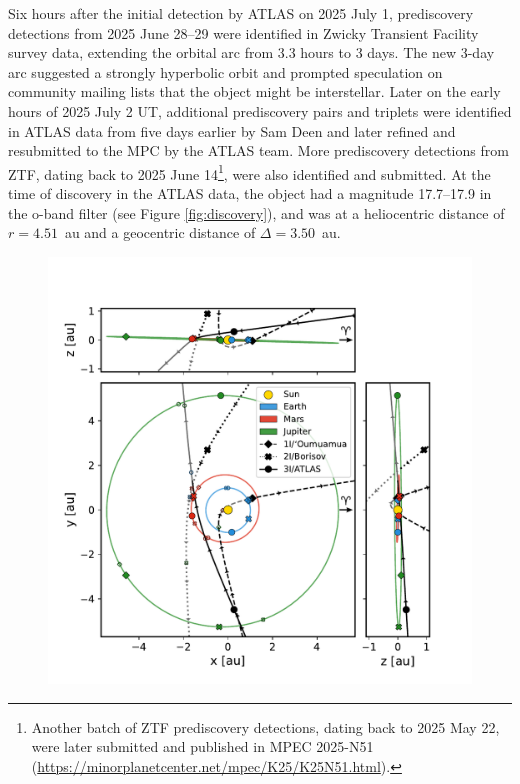 \documentclass[twocolumn,longbib]{aastex7}
\begin{document}
\begin{CJK*}{UTF8}{gbsn}
Six hours after the initial detection by ATLAS on 2025 July 1, prediscovery detections from 2025 June 28--29 were identified in Zwicky Transient Facility \citep[ZTF;][]{bellm2019_ztf, 2019PASP..131g8001G} survey data, extending the orbital arc from 3.3 hours to 3 days. The new 3-day arc suggested a strongly hyperbolic orbit and prompted speculation on community mailing lists that the object might be interstellar. Later on the early hours of 2025 July 2 UT, additional prediscovery pairs and triplets were identified in ATLAS data from five days earlier by Sam Deen and later refined and resubmitted to the MPC by the ATLAS team. More prediscovery detections from ZTF, dating back to 2025 June 14\footnote{Another batch of ZTF prediscovery detections, dating back to 2025 May 22, were later submitted and published in MPEC 2025-N51 (\url{https://minorplanetcenter.net/mpec/K25/K25N51.html}).}, were also identified and submitted.
At the time of discovery in the ATLAS data, the object had a magnitude 17.7--17.9 in the o-band filter (see Figure \ref{fig:discovery}), and was at a heliocentric distance of $r=4.51$~au and a geocentric distance of $\Delta=3.50$~au.
\begin{figure}
    \centering
    \includegraphics[width=1.\linewidth, trim=3.5mm 3mm 4mm 3mm, clip]{static/orbit_1I_2I_3I.pdf}

\end{figure}
\end{CJK*}
\end{document}
